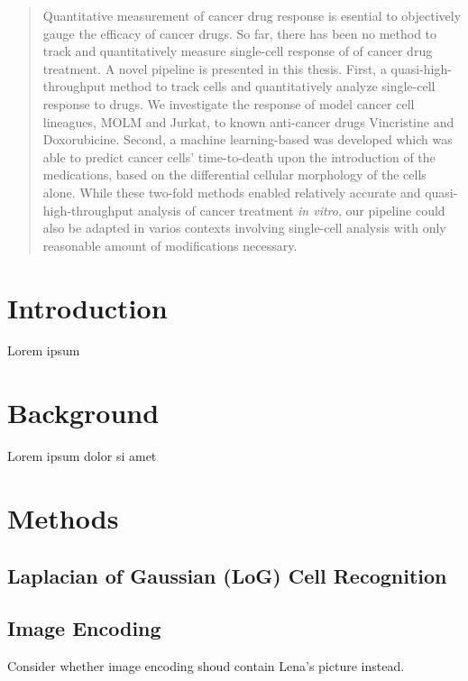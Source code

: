 \documentclass[pdftex,12pt,a4paper]{report}
\begin{document}
\newpage


\begin{abstract}
Quantitative measurement of cancer drug response is esential to objectively gauge the efficacy of cancer drugs. So far, there has been no method to track and  quantitatively measure single-cell response of of cancer drug treatment. A novel pipeline is presented in this thesis. First, a quasi-high-throughput method to track cells and quantitatively analyze single-cell response to drugs. We investigate the response of model cancer cell lineagues, MOLM and Jurkat, to known anti-cancer drugs Vincristine and Doxorubicine. Second, a machine learning-based was developed which was able to predict cancer cells' time-to-death upon the introduction of the medications, based on the differential cellular morphology of the cells alone. While these two-fold methods enabled relatively accurate and quasi-high-throughput analysis of cancer treatment \textit{in vitro}, our pipeline could also be adapted in varios contexts involving single-cell analysis with only reasonable amount of modifications necessary.
\end{abstract}

\newpage



\chapter{Introduction}

Lorem ipsum

\chapter{Background}

Lorem ipsum dolor si amet

\chapter{Methods}

\section{Laplacian of Gaussian (LoG) Cell Recognition}

\section{Image Encoding}

Consider whether image encoding shoud contain Lena's picture instead.
\end{document}
